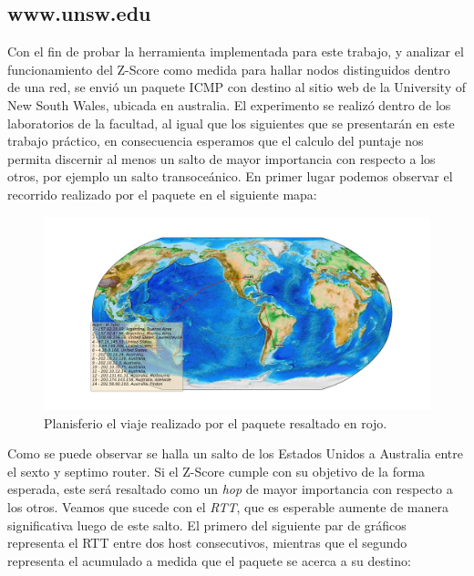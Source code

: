 \subsection{www.unsw.edu}

Con el fin de probar la herramienta implementada para este trabajo, y analizar el funcionamiento del Z-Score como medida para hallar nodos distinguidos dentro de una red, se envió un paquete ICMP con destino al sitio web de la University of New South Wales, ubicada en australia. El experimento se realizó dentro de los laboratorios de la facultad, al igual que los siguientes que se presentarán en este trabajo práctico, en consecuencia esperamos que el calculo del puntaje nos permita discernir al menos un salto de mayor importancia con respecto a los otros, por ejemplo un salto transoceánico. En primer lugar podemos observar el recorrido realizado por el paquete en el siguiente mapa:

\begin{figure}[H]
  \centering	
	\includegraphics[scale=0.3]{../australia-experiment/figure_1.jpeg}
  \caption{Planisferio el viaje realizado por el paquete resaltado en rojo.}
	\label{fig:histo-src-sitiotrabajo}
\end{figure}

Como se puede observar se halla un salto de los Estados Unidos a Australia entre el sexto y septimo router. Si el Z-Score cumple con su objetivo de la forma esperada, este será resaltado como un \textit{hop} de mayor importancia con respecto a los otros. Veamos que sucede con el \textit{RTT}, que es esperable aumente de manera significativa luego de este salto. El primero del siguiente par de gráficos representa el RTT entre dos host consecutivos, mientras que el segundo representa el acumulado a medida que el paquete se acerca a su destino: 

